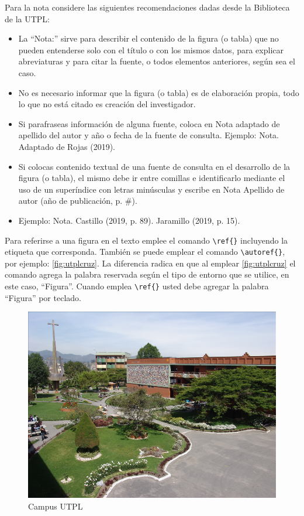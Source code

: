 Para la nota considere las siguientes recomendaciones dadas desde la Biblioteca de la UTPL: 
\begin{itemize}
	\item La ``Nota:'' sirve para describir el contenido de la figura (o tabla) que no pueden entenderse solo con el título o con los mismos datos, para explicar abreviaturas y para citar la fuente, o todos elementos anteriores, según sea el caso.
	
	\item No es necesario informar que la figura (o tabla) es de elaboración propia, todo lo que no está citado es creación del investigador.
	
	\item Si parafraseas información de alguna fuente, coloca en Nota adaptado de apellido del autor y año o fecha de la fuente de consulta. 
	Ejemplo: Nota. Adaptado de Rojas (2019).
	
	\item Si colocas contenido textual de una fuente de consulta en el desarrollo de la figura (o tabla), el mismo debe ir entre comillas e identificarlo mediante el uso de un superíndice con letras minúsculas y escribe en Nota Apellido de autor (año de publicación, p. \#).
	
	\item Ejemplo: Nota. Castillo (2019, p. 89). Jaramillo (2019, p. 15).
\end{itemize}

Para referirse a una figura en el texto emplee el comando \lstinline|\ref{}| incluyendo la etiqueta que corresponda. También se puede emplear el comando \lstinline|\autoref{}|, por ejemplo: \autoref{fig:utplcruz}. La diferencia radica en que al emplear  \autoref{fig:utplcruz} el comando agrega la palabra reservada según el tipo de entorno que se utilice, en este caso, ``Figura''. Cuando emplea \lstinline|\ref{}| usted debe agregar la palabra ``Figura'' por teclado. 

\begin{figure}[h!]
	\centering
	\captionsetup{width=0.7\textwidth}
	\caption{Campus UTPL}
	\label{fig:utplcruz}
	\includegraphics[width=0.7\linewidth]{FIGURES/UTPL_cruz}
\end{figure}


